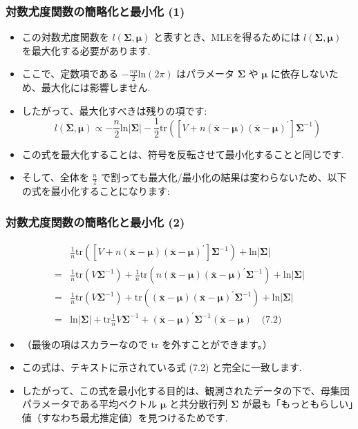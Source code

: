 \documentclass[aspectratio=169]{beamer}
\begin{document}
\begin{frame}
\frametitle{対数尤度関数の簡略化と最小化 (1)}
\begin{itemize}
    \item この対数尤度関数を $l(\bm{\Sigma},\bm{\mu})$ と表すとき、MLEを得るためには $l(\bm{\Sigma},\bm{\mu})$ を最大化する必要があります.
    \item ここで、定数項である $-\frac{np}{2}\text{ln}(2\pi)$ はパラメータ $\bm{\Sigma}$ や $\bm{\mu}$ に依存しないため、最大化には影響しません.
    \item したがって、最大化すべきは残りの項です:
    \[
    l(\bm{\Sigma},\bm{\mu})\propto-\frac{n}{2}\text{ln}|\bm{\Sigma}|-\frac{1}{2}\text{tr}\left([V+n(\overline{\bm{x}}-\bm{\mu})(\overline{\bm{x}}-\bm{\mu})^{\prime}]\bm{\Sigma}^{-1}\right)
    \]
    \item この式を最大化することは、符号を反転させて最小化することと同じです.
    \item そして、全体を $\frac{n}{2}$ で割っても最大化/最小化の結果は変わらないため、以下の式を最小化することになります:
\end{itemize}
\end{frame}

\begin{frame}
\frametitle{対数尤度関数の簡略化と最小化 (2)}
\begin{align*}
&\frac{1}{n}\text{tr}\left([V+n(\overline{\bm{x}}-\bm{\mu})(\overline{\bm{x}}-\bm{\mu})^{\prime}]\bm{\Sigma}^{-1}\right)+\text{ln}|\bm{\Sigma}| \\
=&\frac{1}{n}\text{tr}(V\bm{\Sigma}^{-1})+\frac{1}{n}\text{tr}(n(\overline{\bm{x}}-\bm{\mu})(\overline{\bm{x}}-\bm{\mu})^{\prime}\bm{\Sigma}^{-1})+\text{ln}|\bm{\Sigma}| \\
=&\frac{1}{n}\text{tr}(V\bm{\Sigma}^{-1})+\text{tr}((\overline{\bm{x}}-\bm{\mu})(\overline{\bm{x}}-\bm{\mu})^{\prime}\bm{\Sigma}^{-1})+\text{ln}|\bm{\Sigma}| \\
=&\text{ln}|\bm{\Sigma}|+\text{tr}\frac{1}{n}V\bm{\Sigma}^{-1}+(\overline{\bm{x}}-\bm{\mu})^{\prime}\bm{\Sigma}^{-1}(\overline{\bm{x}}-\bm{\mu}) \quad \text{(7.2)}
\end{align*}
\begin{itemize}
    \item （最後の項はスカラーなので $\text{tr}$ を外すことができます。）
    \item この式は、テキストに示されている式 (7.2) と完全に一致します.
    \item したがって、この式を最小化する目的は、観測されたデータの下で、母集団パラメータである平均ベクトル $\bm{\mu}$ と共分散行列 $\bm{\Sigma}$ が最も「もっともらしい」値（すなわち最尤推定値）を見つけるためです.
\end{itemize}
\end{frame}
\end{document}
